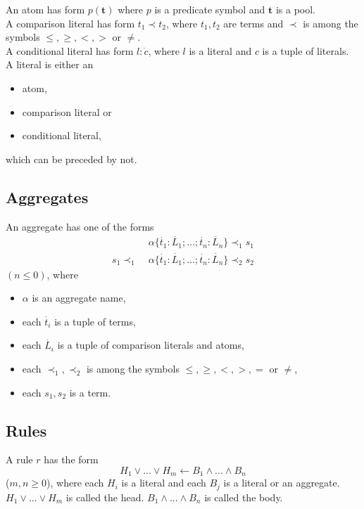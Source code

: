 \documentclass{article}
\newcommand{\pool}[1]{\boldsymbol{#1}}
\newcommand{\tuple}[1]{\dot{#1}}
\begin{document}
	An atom has form $p(\pool{t})$ where $p$ is a predicate symbol and $\pool{t}$ is a pool. 
	\\
	A comparison literal has form $t_1 \prec t_2$, where $t_1,t_2$ are terms and $\prec$ is among the symbols $\leq,\ge,<,>$ or $\neq$.
	\\
	A conditional literal has form $l : \tuple{c}$, where $l$ is a literal and $c$ is a tuple of literals.
	\\
	A literal is either an
	\begin{itemize}
		\item atom,
		\item comparison literal or
		\item conditional literal,
	\end{itemize}
	which can be preceded by not.

	\subsection{Aggregates}
	An aggregate has one of the forms
	\begin{align}
		&\alpha\{\tuple{t_1} : \tuple{L_1}; \dots; \tuple{t_n} : \tuple{L_n}\} \prec_1 s_1 \label{aggregate1} \\
		s_1 \prec_1 \; &\alpha\{\tuple{t_1} : \tuple{L_1}; \dots; \tuple{t_n} : \tuple{L_n}\} \prec_2 s_2 \label{aggregate3}
	\end{align}
	$(n \leq 0)$, where
	\begin{itemize}
		\item $\alpha$ is an aggregate name,
		\item each $\tuple{t_i}$ is a tuple of terms,
		\item each $\tuple{L_i}$ is a tuple of comparison literals and atoms,
		\item each $\prec_1, \prec_2$ is among the symbols $\leq,\ge,<,>,=$ or $\neq$,
		\item each $s_1, s_2$ is a term.
	\end{itemize}

	\subsection{Rules}

	A rule $r$ has the form
	\begin{equation}
		H_1 \lor ... \lor H_m  \leftarrow B_1 \land ... \land B_n \label{rule}
	\end{equation}
	($m, n \ge 0$), where each $H_i$ is a literal and each $B_j$ is a literal or an aggregate.
	$H_1 \lor ... \lor H_m$ is called the head. $B_1 \land ... \land B_n$ is called the body.
\end{document}
